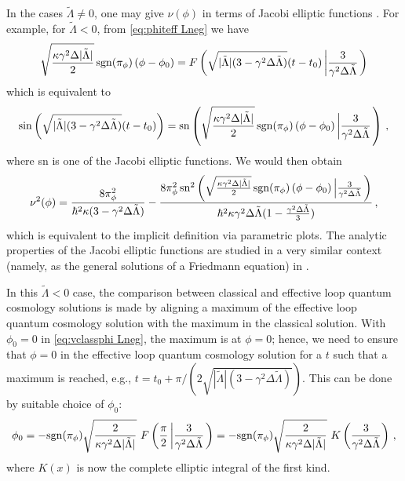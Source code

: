 \documentclass[aps,prd,11pt,showkeys,nofootinbib]{revtex4-2}
\begin{document}
In the cases $\tilde\Lambda\neq 0$, one may give $\nu(\phi)$ in terms of Jacobi elliptic functions \cite{abramowitz}. For example, for $\tilde\Lambda<0$, from \eqref{eq:phiteff Lneg} we have
\begin{equation}
\sqrt{\frac{\kappa\gamma^2\Delta|\tilde{\Lambda}|}{2}}\,{\rm sgn}(\pi_\phi)\left(\phi - \phi_0 \right) =   F\left(\sqrt{|\tilde\Lambda|(3-\gamma^2\Delta\tilde\Lambda)}(t-t_0) \left \vert \frac{3}{\gamma^2\Delta\tilde{\Lambda}} \right. \right)
\end{equation}
which is equivalent to
\begin{equation}
\sin\left(\sqrt{|\tilde\Lambda|(3-\gamma^2\Delta\tilde\Lambda)}(t-t_0)\right) = {\rm sn}\left( \sqrt{\frac{\kappa\gamma^2\Delta|\tilde{\Lambda}|}{2}}\,{\rm sgn}(\pi_\phi)\left(\phi - \phi_0 \right) \left\vert \frac{3}{\gamma^2\Delta\tilde{\Lambda}} \right. \right)\,,
\end{equation}
where sn is one of the Jacobi elliptic functions. We would then obtain
\begin{equation}
\nu^2(\phi) = \frac{8\pi_\phi^2}{\hbar^2\kappa(3-\gamma^2\Delta\tilde\Lambda)}-\frac{8\pi_\phi^2\,{\rm sn}^2 \left( \sqrt{\frac{\kappa\gamma^2\Delta|\tilde{\Lambda}|}{2}}\,{\rm sgn}(\pi_\phi)\left(\phi - \phi_0 \right) \left\vert \frac{3}{\gamma^2\Delta\tilde{\Lambda}} \right. \right)}{\hbar^2\kappa\gamma^2\Delta\tilde\Lambda(1-\frac{\gamma^2\Delta\tilde\Lambda}{3})}\,,
\end{equation}
which is equivalent to the implicit definition via parametric plots. The analytic properties of the Jacobi elliptic functions are studied in a very similar context (namely, as the general solutions of a Friedmann equation) in \cite{Boyle:2021jej}.

In this $\tilde\Lambda<0$ case, the comparison between classical and effective loop quantum cosmology solutions is made by aligning a maximum of the effective loop quantum cosmology solution with the maximum in the classical solution. With $\phi_0=0$ in \eqref{eq:vclassphi Lneg}, the maximum is at $\phi=0$; hence, we need to ensure that $\phi=0$ in the effective loop quantum cosmology solution for a $t$ such that a maximum is reached, e.g., $t=t_0+\pi/(2\sqrt{|\tilde{\Lambda}|(3-\gamma^2\Delta\tilde{\Lambda})})$. This can be done by suitable choice of $\phi_0$:
\begin{equation}
  \phi_0 =-{\rm sgn}(\pi_\phi)\sqrt{\frac{2}{\kappa\gamma^2\Delta|\tilde{\Lambda}|}}\  F\left(\frac{\pi}{2} \left \vert \frac{3}{\gamma^2\Delta\tilde{\Lambda}} \right. \right)  =-{\rm sgn}(\pi_\phi)\sqrt{\frac{2}{\kappa\gamma^2\Delta|\tilde{\Lambda}|}}\  K\left(\frac{3}{\gamma^2\Delta\tilde{\Lambda}}  \right)\,,
\end{equation}
where $K(x)$ is now the complete elliptic integral of the first kind.
\end{document}
